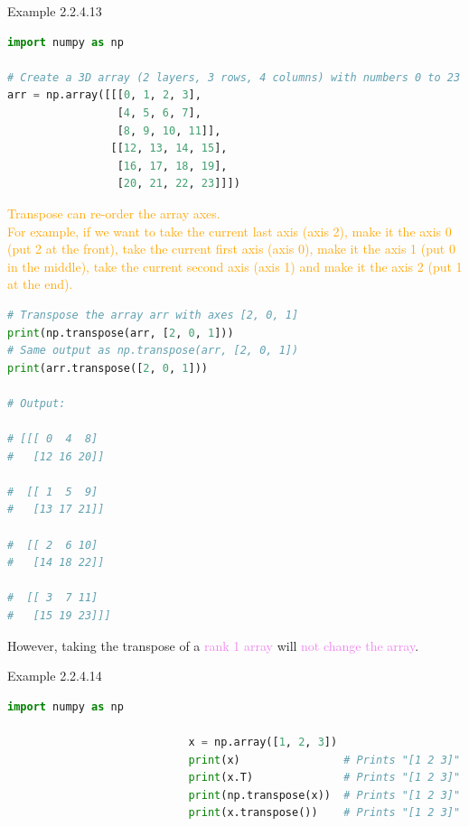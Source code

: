 \documentclass{book}
\begin{document}
\begin{egBox}{Example 2.2.4.13}{}
    \begin{lstlisting}[language=Python, basicstyle=\ttfamily\small, keywordstyle=\color{blue}, commentstyle=\color{forestgreen}, stringstyle=\color{red}, showstringspaces=false]
import numpy as np

# Create a 3D array (2 layers, 3 rows, 4 columns) with numbers 0 to 23
arr = np.array([[[0, 1, 2, 3],
                 [4, 5, 6, 7],
                 [8, 9, 10, 11]],
                [[12, 13, 14, 15],
                 [16, 17, 18, 19],
                 [20, 21, 22, 23]]])

    \end{lstlisting}
\textcolor{orange}{Transpose can re-order the array axes.}\\
\textcolor{orange}{For example, if we want to take the current last axis (axis 2), make it the axis 0 (put 2 at the front), take the current first axis (axis 0), make it the axis 1 (put 0 in the middle), take the current second axis (axis 1) and make it the axis 2 (put 1 at the end).}
    \begin{lstlisting}[language=Python, basicstyle=\ttfamily\small, keywordstyle=\color{blue}, commentstyle=\color{forestgreen}, stringstyle=\color{red}, showstringspaces=false]
# Transpose the array arr with axes [2, 0, 1]
print(np.transpose(arr, [2, 0, 1]))
# Same output as np.transpose(arr, [2, 0, 1])
print(arr.transpose([2, 0, 1]))

# Output:

# [[[ 0  4  8]
#   [12 16 20]]

#  [[ 1  5  9]
#   [13 17 21]]

#  [[ 2  6 10]
#   [14 18 22]]

#  [[ 3  7 11]
#   [15 19 23]]]
    \end{lstlisting}
\end{egBox}
However, taking the transpose of a \textcolor{violet}{rank 1 array} will \textcolor{violet}{not change the array}.
\begin{egBox}{Example 2.2.4.14}{}
    \begin{lstlisting}[language=Python, basicstyle=\ttfamily\small, keywordstyle=\color{blue}, commentstyle=\color{forestgreen}, stringstyle=\color{red}, showstringspaces=false]
                            import numpy as np

                            x = np.array([1, 2, 3])
                            print(x)                # Prints "[1 2 3]"
                            print(x.T)              # Prints "[1 2 3]"
                            print(np.transpose(x))  # Prints "[1 2 3]"
                            print(x.transpose())    # Prints "[1 2 3]"
    \end{lstlisting}
\end{egBox}
\end{document}
